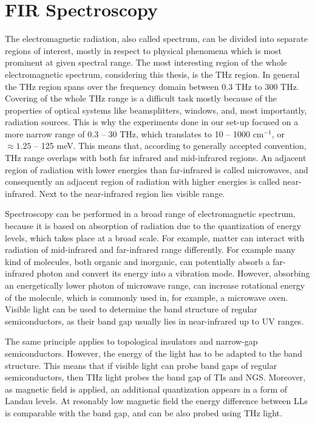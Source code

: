 \documentclass[titlepage,a4paper]{book}
\newcommand{\wciecie}{\quad\phantom{v}}
\begin{document}
\section{FIR Spectroscopy}
\wciecie
The electromagnetic radiation, also called spectrum, can be divided into separate regions of interest, mostly in respect to physical phenomena which is most prominent at given spectral range. The most interesting region of the whole electromagnetic spectrum, considering this thesis, is the THz region. In general the THz region spans over the frequency domain between 0.3 THz to 300 THz. Covering of the whole THz range is a difficult task mostly because of the properties of optical systems like beamsplitters, windows, and, most importantly, radiation sources. This is why the experiments done in our set-up focused on a more narrow range of 0.3 -- 30 THz, which translates to 10 -- 1000 cm$^{-1}$, or $\approx 1.25$ -- 125 meV. This means that, according to generally accepted convention, THz range overlaps with both far infrared and mid-infrared regions. An adjacent region of radiation with lower energies than far-infrared is called microwaves, and consequently an adjacent region of radiation with higher energies is called near-infrared. Next to the near-infrared region lies visible range.

Spectroscopy can be performed in a broad range of electromagnetic spectrum, because it is based on absorption of radiation due to the quantization of energy levels, which takes place at a broad scale. For example, matter can interact with radiation of mid-infrared and far-infrared range differently. For example many kind of molecules, both organic and inorganic, can potentially absorb a far-infrared photon and convert its energy into a vibration mode. However, absorbing an energetically lower photon of microwave range, can increase rotational energy of the molecule, which is commonly used in, for example, a microwave oven. Visible light can be used to determine the band structure of regular semiconductors, as their band gap usually lies in near-infrared up to UV ranges.

The same principle applies to topological insulators and narrow-gap semiconductors. However, the energy of the light has to be adapted to the band structure. This means that if visible light can probe band gaps of regular semiconductors, then THz light probes the band gap of TIs and NGS. Moreover, as magnetic field is applied, an additional quantization appears in a form of Landau levels. At resonably low magnetic field the energy difference between LLs is comparable with the band gap, and can be also probed using THz light.
\end{document}
